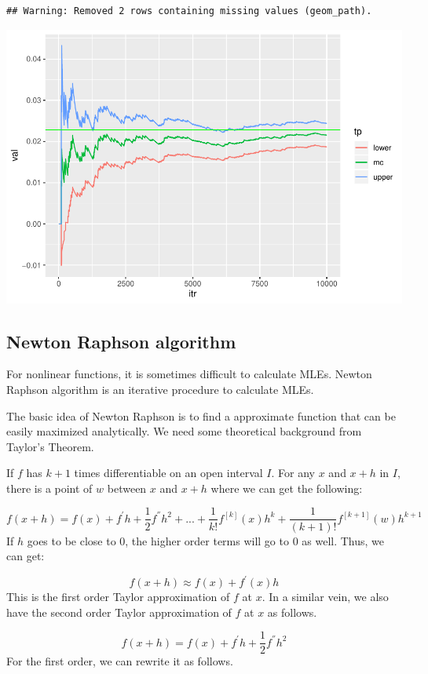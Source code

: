 \documentclass[]{book}
\begin{document}
\begin{verbatim}
## Warning: Removed 2 rows containing missing values (geom_path).
\end{verbatim}

\includegraphics{bookdown-demo_files/figure-latex/unnamed-chunk-17-1.pdf}

\subsection{Newton Raphson algorithm}\label{newton-raphson-algorithm}

For nonlinear functions, it is sometimes difficult to calculate MLEs.
Newton Raphson algorithm is an iterative procedure to calculate MLEs.

The basic idea of Newton Raphson is to find a approximate function that
can be easily maximized analytically. We need some theoretical
background from Taylor's Theorem.

If \(f\) has \(k+1\) times differentiable on an open interval \(I\). For
any \(x\) and \(x+h\) in \(I\), there is a point of \(w\) between \(x\)
and \(x+h\) where we can get the following:

\[f(x+h)=f(x)+f^{'}h+\frac{1}{2}f^{''}h^2+...+\frac{1}{k!}f^{[k]}(x)h^k+\frac{1}{(k+1)!}f^{[k+1]}(w)h^{k+1}\]
If \(h\) goes to be close to \(0\), the higher order terms will go to
\(0\) as well. Thus, we can get:

\[f(x+h) \approx f(x)+f^{'}(x)h \] This is the first order Taylor
approximation of \(f\) at \(x\). In a similar vein, we also have the
second order Taylor approximation of \(f\) at \(x\) as follows.

\[f(x+h)=f(x)+f^{'}h+\frac{1}{2}f^{''}h^2\] For the first order, we can
rewrite it as follows.
\end{document}
